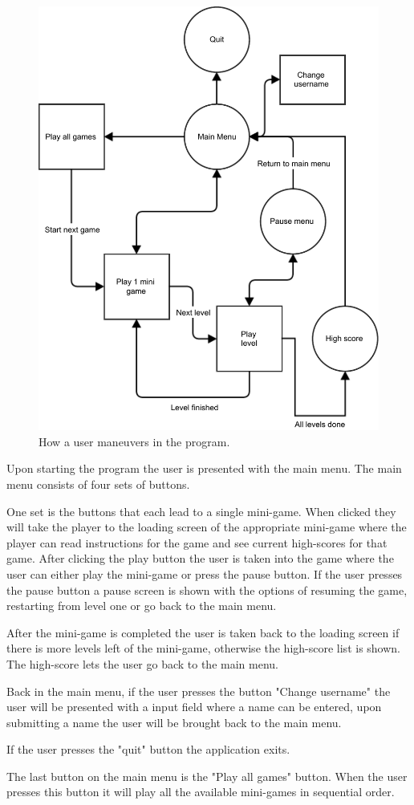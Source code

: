 \begin{figure}[ht]
	\capstart
	\includegraphics[width=\textwidth]{images/user_flow_chart}
	\caption[Program flow chart]{How a user maneuvers in the program.}
	\label{fig:program_flow_chart}
\end{figure}

Upon starting the program the user is presented with the main menu.
The main menu consists of four sets of buttons.

One set is the buttons that each lead to a single mini-game. 
When clicked they will take the player to the loading screen of the appropriate mini-game where the player can read instructions for the game and see current high-scores for that game.
After clicking the play button the user is taken into the game where the user can either play the mini-game or press the pause button.
If the user presses the pause button a pause screen is shown with the options of resuming the game, restarting from level one or go back to the main menu.

After the mini-game is completed the user is taken back to the loading screen if there is more levels left of the mini-game, otherwise the high-score list is shown.
The high-score lets the user go back to the main menu.

Back in the main menu, if the user presses the button "Change username" the user will be presented with a input field where a name can be entered, upon submitting a name the user will be brought back to the main menu.

If the user presses the "quit" button the application exits.

The last button on the main menu is the "Play all games" button. When the user presses this button it will play all the available mini-games in sequential order.